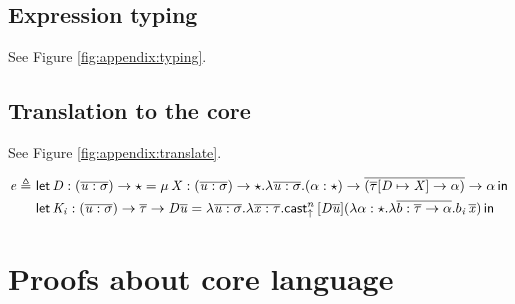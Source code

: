 \subsection{Expression typing}
See Figure \ref{fig:appendix:typing}.
\begin{figure*}[ht]
\ottdefnctxsrc{}
\ottdefnpgmsrc{}
\ottdefndeclsrc{}
\ottdefnpatsrc{}
\ottdefnexprsrc{}
\caption{Typing rules of source language}
\label{fig:appendix:typing}
\end{figure*}

\subsection{Translation to the core}
See Figure \ref{fig:appendix:translate}.
\begin{figure*}[ht]
\ottdefnpgmtrans{}
\ottdefndecltrans{}
\begin{align*}
\mathit{e}  \triangleq ~  &  \mathsf{let} \, \mathit{D}  :  (  \overline{  \mathit{u}  :  \sigma  }  )  \rightarrow  \star  =  \mu \, \mathit{X}  :  (  \overline{  \mathit{u}  :  \sigma  }  )  \rightarrow  \star  .  \lambda  \overline{  \mathit{u}  :  \sigma  }  .  (  \alpha  :  \star  )  \rightarrow  \overline{  (  \overline{  \tau  }  [  \mathit{D}  \mapsto  \mathit{X}  ]  \rightarrow  \alpha  )  }  \rightarrow  \alpha \, \mathsf{in} \, \\ &  \mathsf{let} \, \mathit{K_{\mathit{i}}}  :  (  \overline{  \mathit{u}  :  \sigma  }  )  \rightarrow  \overline{  \tau  }  \rightarrow  \mathit{D}    \overline{  \mathit{u}  }  =  \lambda  \overline{  \mathit{u}  :  \sigma  }  .  \lambda  \overline{  \mathit{x}  :  \tau  }  .  \mathsf{cast}_{\uparrow}^n \, [  \mathit{D}    \overline{  \mathit{u}  }  ]  (  \lambda  \alpha  :  \star  .  \lambda  \overline{  b  :  \overline{  \tau  }  \rightarrow  \alpha  }  .  b_{\mathit{i}} \, \overline{  \mathit{x}  }  ) \, \mathsf{in} \, 
\end{align*}
\ottdefnpattrans{}
\ottdefnexprtrans{}
\caption{Translation rules of source language}
\label{fig:appendix:translate}
\end{figure*}

\section{Proofs about core language}
